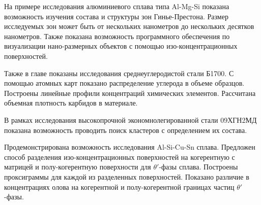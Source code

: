 На примере исследования алюминиевого сплава типа Al-Mg-Si показана возможность изучения состава и структуры зон Гинье-Престона. Размер исследуемых зон может быть от нескольких нанометров до нескольких десятков нанометров. Также показана возможность программного обеспечения по визуализации нано-размерных объектов с помощью изо-концентрационных поверхностей.

Также в главе показаны исследования среднеуглеродистой стали Б1700. С помощью атомных карт показано распределение углерода в объеме образцов. Построены линейные профили концентраций химических элементов. Рассчитана объемная плотность карбидов в материале.

В рамках исследования высокопрочной экономнолегированной стали 09ХГН2МД показана возможность проводить поиск кластеров с определением их состава.

Продемонстрирована возможность исследования Al-Si-Cu-Sn сплава. Предложен способ разделения изо-концентрационных поверхностей на когерентную с матрицей и полу-когерентную поверхности для $\theta '$-фазы сплава. Построены проксиграммы для каждой из разделенных поверхностей. Показано различие в концентрациях олова на когерентной и полу-когерентной границах частиц $\theta '$-фазы.




\FloatBarrier
\clearpage


















